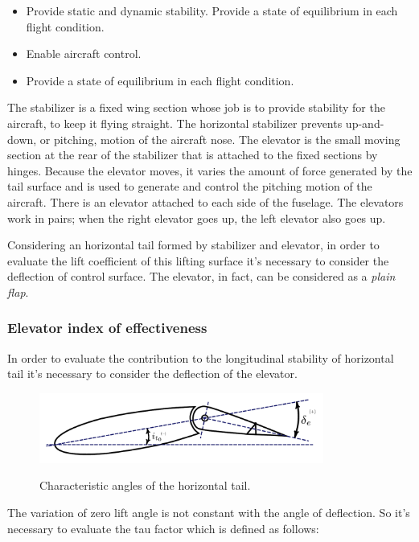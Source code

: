 \begin{itemize}
\item Provide static and dynamic stability.
Provide a state of equilibrium in each flight condition.
\item Enable aircraft control.
\item Provide a state of equilibrium in each flight condition.
\end{itemize}

The stabilizer is a fixed wing section whose job is to provide stability for the aircraft, to keep it flying straight. The horizontal stabilizer prevents up-and-down, or pitching, motion of the aircraft nose. The elevator is the small moving section at the rear of the stabilizer that is attached to the fixed sections by hinges. Because the elevator moves, it varies the amount of force generated by the tail surface and is used to generate and control the pitching motion of the aircraft. There is an elevator attached to each side of the fuselage. The elevators work in pairs; when the right elevator goes up, the left elevator also goes up.

Considering an horizontal tail formed by stabilizer and elevator, in order to evaluate the lift coefficient of this lifting surface it's necessary to consider the deflection of control surface. The elevator, in fact, can be considered as a {\itshape plain flap}.

\subsubsection{Elevator index of effectiveness}
 In order to evaluate the contribution to the longitudinal stability of horizontal tail it's necessary to consider the deflection of the elevator. 
		
\begin{figure}[H]
\centering
{\includegraphics[height=2.3cm]{Immagini/horizontal_tail_profile_deltaE.pdf}} 
\label{htailangle}
\caption{Characteristic angles of the horizontal tail.}
\end{figure} 		
		
The variation of zero lift angle is not constant with the angle of deflection. So it's necessary to evaluate the tau factor which is defined as follows:

